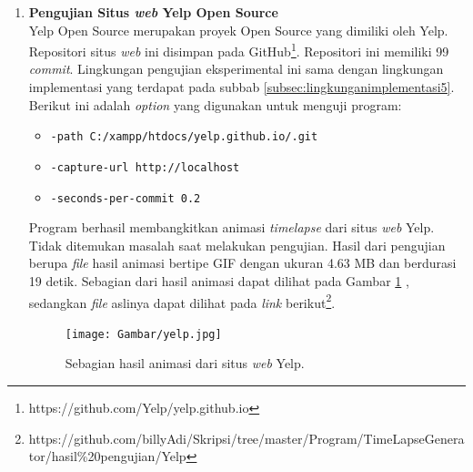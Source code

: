 \begin{enumerate}
\item \textbf{Pengujian Situs \textit{web} Yelp Open Source}\\
Yelp Open Source merupakan proyek Open Source yang dimiliki oleh Yelp. Repositori situs \textit{web} ini disimpan pada GitHub\footnote{https://github.com/Yelp/yelp.github.io}. Repositori ini memiliki 99 \textit{commit}. Lingkungan pengujian eksperimental ini sama dengan lingkungan implementasi yang terdapat pada subbab \ref{subsec:lingkunganimplementasi5}. Berikut ini adalah \textit{option} yang digunakan untuk menguji program:
\begin{itemize}
\item \texttt{-path C:/xampp/htdocs/yelp.github.io/.git}
\item \texttt{-capture-url http://localhost}
\item \texttt{-seconds-per-commit 0.2} 
\end{itemize}
Program berhasil membangkitkan animasi \textit{timelapse} dari situs \textit{web} Yelp. Tidak ditemukan masalah saat melakukan pengujian. Hasil dari pengujian berupa \textit{file} hasil animasi bertipe GIF dengan ukuran 4.63 MB dan berdurasi 19 detik. Sebagian dari hasil animasi dapat dilihat pada Gambar \ref{fig:hasil_yelp} , sedangkan \textit{file} aslinya dapat dilihat pada \textit{link} berikut\footnote{https://github.com/billyAdi/Skripsi/tree/master/Program/TimeLapseGenerator/hasil\%20pengujian/Yelp}.


\begin{figure}[H]	
		\texttt{[image: Gambar/yelp.jpg]}
	\caption{Sebagian hasil animasi dari situs \textit{web} Yelp.}
	\label{fig:hasil_yelp}
\end{figure}




\end{enumerate}




